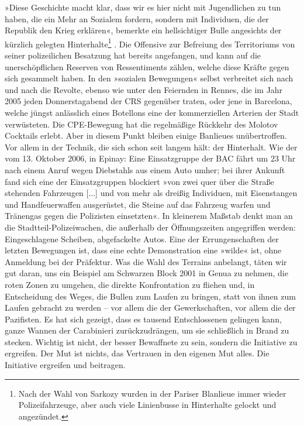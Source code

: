»Diese Geschichte macht klar, dass wir es hier nicht mit
Jugendlichen zu tun haben, die ein Mehr an Sozialem fordern,
sondern mit Individuen, die der Republik den Krieg erklären«,
bemerkte ein hellsichtiger Bulle angesichts der kürzlich gelegten
Hinterhalte\footnote{
Nach der Wahl von Sarkozy wurden in der Pariser Blanlieue immer
wieder Polizeifahrzeuge, aber auch viele Linienbusse in Hinterhalte
gelockt und angezündet.
}%
. Die Offensive zur Befreiung des Territoriums von
seiner polizeilichen Besatzung hat bereits angefangen, und kann auf
die unerschöpflichen Reserven von Ressentiments zählen, welche
diese Kräfte gegen sich gesammelt haben. In den »sozialen
Bewegungen« selbst verbreitet sich nach und nach die Revolte,
ebenso wie unter den Feiernden in Rennes, die im Jahr 2005 jeden
Donnerstagabend der CRS gegenüber traten, oder jene in Barcelona,
welche jüngst anlässlich eines Botellons eine der kommerziellen
Arterien der Stadt verwüsteten. Die CPE-Bewegung hat die
regelmäßige Rückkehr des Molotov Cocktails erlebt. Aber in diesem
Punkt bleiben einige Banlieues unübertroffen. Vor allem in der
Technik, die sich schon seit langem hält: der Hinterhalt. Wie der
vom 13. Oktober 2006, in Epinay: Eine Einsatzgruppe der BAC fährt
um 23 Uhr nach einem Anruf wegen Diebstahls aus einem Auto umher;
bei ihrer Ankunft fand sich eine der Einsatzgruppen blockiert »von
zwei quer über die Straße stehenden Fahrzeugen [...] und von mehr
als dreißig Individuen, mit Eisenstangen und Handfeuerwaffen
ausgerüstet, die Steine auf das Fahrzeug warfen und Tränengas gegen
die Polizisten einsetzten«. In kleinerem Maßstab denkt man an die
Stadtteil-Polizeiwachen, die außerhalb der Öffnungszeiten
angegriffen werden: Eingeschlagene Scheiben, abgefackelte Autos.
Eine der Errungenschaften der letzten Bewegungen ist, dass eine
echte Demonstration eine »wilde« ist, ohne Anmeldung bei der
Präfektur. Was die Wahl des Terrains anbelangt, täten wir gut
daran, uns ein Beispiel am Schwarzen Block 2001 in Genua zu nehmen,
die roten Zonen zu umgehen, die direkte Konfrontation zu fliehen
und, in Entscheidung des Weges, die Bullen zum Laufen zu bringen,
statt von ihnen zum Laufen gebracht zu werden – vor allem die der
Gewerkschaften, vor allem die der Pazifisten. Es hat sich gezeigt,
dass es tausend Entschlossenen gelingen kann, ganze Wannen der
Carabinieri zurückzudrängen, um sie schließlich in Brand zu
stecken. Wichtig ist nicht, der besser Bewaffnete zu sein, sondern
die Initiative zu ergreifen. Der Mut ist nichts, das Vertrauen in
den eigenen Mut alles. Die Initiative ergreifen und beitragen.


